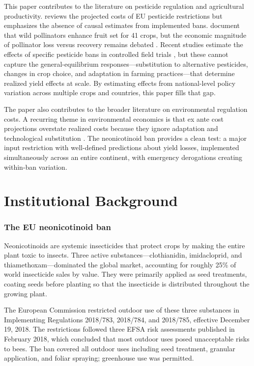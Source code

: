 \documentclass[12pt]{article}
\begin{document}
This paper contributes to the literature on pesticide regulation and agricultural productivity. \citet{jarvis2021impact} reviews the projected costs of EU pesticide restrictions but emphasizes the absence of causal estimates from implemented bans. \citet{garibaldi2013wild} document that wild pollinators enhance fruit set for 41 crops, but the economic magnitude of pollinator loss versus recovery remains debated \citep{aizen2019global}. Recent studies estimate the effects of specific pesticide bans in controlled field trials \citep{pywell2015wildlife,sterk2016effects}, but these cannot capture the general-equilibrium responses---substitution to alternative pesticides, changes in crop choice, and adaptation in farming practices---that determine realized yield effects at scale. By estimating effects from national-level policy variation across multiple crops and countries, this paper fills that gap.

The paper also contributes to the broader literature on environmental regulation costs. A recurring theme in environmental economics is that ex ante cost projections overstate realized costs because they ignore adaptation and technological substitution \citep{harrington2000accuracy}. The neonicotinoid ban provides a clean test: a major input restriction with well-defined predictions about yield losses, implemented simultaneously across an entire continent, with emergency derogations creating within-ban variation.

\section{Institutional Background}

\subsubsection*{The EU neonicotinoid ban} Neonicotinoids are systemic insecticides that protect crops by making the entire plant toxic to insects. Three active substances---clothianidin, imidacloprid, and thiamethoxam---dominated the global market, accounting for roughly 25\% of world insecticide sales by value. They were primarily applied as seed treatments, coating seeds before planting so that the insecticide is distributed throughout the growing plant.

The European Commission restricted outdoor use of these three substances in Implementing Regulations 2018/783, 2018/784, and 2018/785, effective December 19, 2018. The restrictions followed three EFSA risk assessments published in February 2018, which concluded that most outdoor uses posed unacceptable risks to bees. The ban covered all outdoor uses including seed treatment, granular application, and foliar spraying; greenhouse use was permitted.
\end{document}
